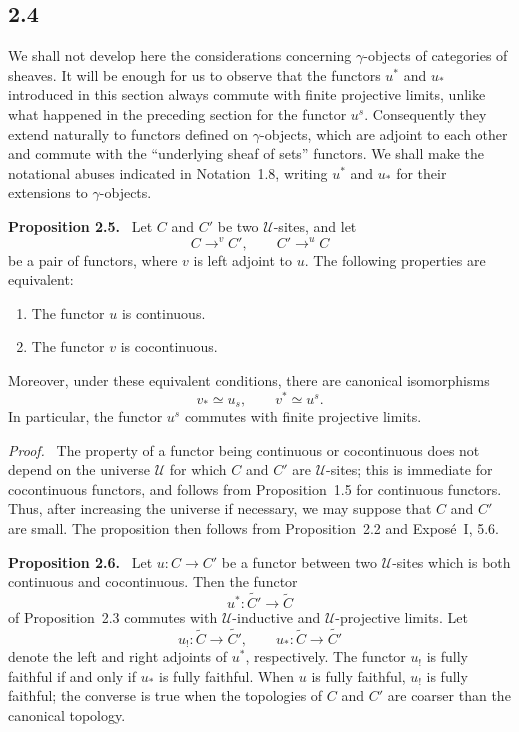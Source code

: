 \documentclass[11pt]{article}
\newcommand{\U}{\mathcal{U}}
\newenvironment{statement}[1]{\par\medskip\noindent\textbf{#1.}\ }{\par\medskip}
\newenvironment{prooftext}{\par\noindent\emph{Proof.}\ }{\par\medskip}
\begin{document}
\subsection*{2.4}
We shall not develop here the considerations concerning \(\gamma\)-objects of categories of sheaves. It will be enough for us to observe that the functors \(u^*\) and \(u_*\) introduced in this section always commute with finite projective limits, unlike what happened in the preceding section for the functor \(u^s\). Consequently they extend naturally to functors defined on \(\gamma\)-objects, which are adjoint to each other and commute with the ``underlying sheaf of sets'' functors. We shall make the notational abuses indicated in Notation~1.8, writing \(u^*\) and \(u_*\) for their extensions to \(\gamma\)-objects.

\begin{statement}{Proposition 2.5}
Let \(C\) and \(C'\) be two \(\U\)-sites, and let
\[
C\mathop{\longrightarrow}^{v} C',\qquad C'\mathop{\longrightarrow}^{u} C
\]
be a pair of functors, where \(v\) is left adjoint to \(u\). The following properties are equivalent:
\begin{enumerate}[label=\roman*)]
\item The functor \(u\) is continuous.
\item The functor \(v\) is cocontinuous.
\end{enumerate}
Moreover, under these equivalent conditions, there are canonical isomorphisms
\[
v_*\simeq u_s,
\qquad
v^*\simeq u^s.
\]
In particular, the functor \(u^s\) commutes with finite projective limits.
\end{statement}

\begin{prooftext}
The property of a functor being continuous or cocontinuous does not depend on the universe \(\U\) for which \(C\) and \(C'\) are \(\U\)-sites; this is immediate for cocontinuous functors, and follows from Proposition~1.5 for continuous functors. Thus, after increasing the universe if necessary, we may suppose that \(C\) and \(C'\) are small. The proposition then follows from Proposition~2.2 and Expos\'e~I, 5.6.
\end{prooftext}

\begin{statement}{Proposition 2.6}
Let \(u:C\to C'\) be a functor between two \(\U\)-sites which is both continuous and cocontinuous. Then the functor
\[
u^*: \widetilde {C'}\longrightarrow\widetilde C
\]
of Proposition~2.3 commutes with \(\U\)-inductive and \(\U\)-projective limits. Let
\[
u_!:\widetilde C\longrightarrow\widetilde {C'},
\qquad
u_*:\widetilde C\longrightarrow\widetilde {C'}
\]
denote the left and right adjoints of \(u^*\), respectively. The functor \(u_!\) is fully faithful if and only if \(u_*\) is fully faithful. When \(u\) is fully faithful, \(u_!\) is fully faithful; the converse is true when the topologies of \(C\) and \(C'\) are coarser than the canonical topology.
\end{statement}
\end{document}
